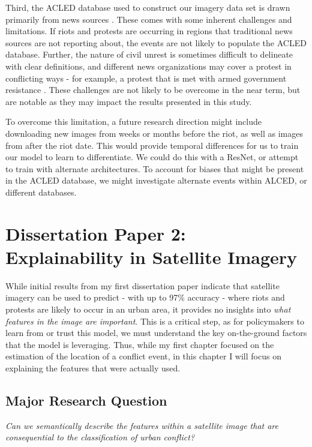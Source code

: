 Third, the ACLED database used to construct our imagery data set is drawn primarily from news sources \citep{acled_codebook_2023}.  These comes with some inherent challenges and limitations.  If riots and protests are occurring in regions that traditional news sources are not reporting about, the events are not likely to populate the ACLED database.  Further, the nature of civil unrest is sometimes difficult to delineate with clear definitions, and different news organizations may cover a protest in conflicting ways - for example, a protest that is met with armed government resistance \citep{acled_codebook_2023}.  These challenges are not likely to be overcome in the near term, but are notable as they may impact the results presented in this study.

To overcome this limitation, a future research direction might include downloading new images from weeks or months before the riot, as well as images from after the riot date.  This would provide temporal differences for us to train our model to learn to differentiate.  We could do this with a ResNet, or attempt to train with alternate architectures.  To account for biases that might be present in the ACLED database, we might investigate alternate events within ALCED, or different databases.  



\section{Dissertation Paper 2: Explainability in Satellite Imagery} \label{sec:paper_two}
While initial results from my first dissertation paper indicate that satellite imagery can be used to predict - with up to 97\% accuracy - where riots and protests are likely to occur in an urban area, it provides no insights into \textit{what features in the image are important}.  This is a critical step, as for policymakers to learn from or trust this model, we must understand the key on-the-ground factors that the model is leveraging. Thus, while my first chapter focused on the estimation of the location of a conflict event, in this chapter I will focus on explaining the features that were actually used.  


\subsection{Major Research Question}
\textit{Can we semantically describe the features within a satellite image that are consequential to the classification of urban conflict?}

